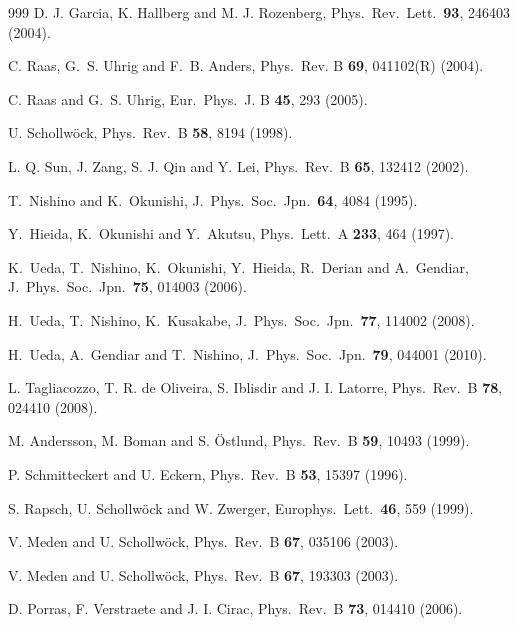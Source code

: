 \documentclass[a4paper,10pt,oneside,onecolumn,1p,times]{elsarticle}
\begin{document}
\begin{thebibliography}{999}
 D. J. Garcia, K. Hallberg and M. J. Rozenberg, Phys.\ Rev.\ Lett.\ {\bf 93}, 246403 (2004). 

C. Raas, G.~S. Uhrig and F.~B. Anders, Phys.\ Rev. B {\bf 69}, 041102(R) (2004).

C. Raas and G.~S. Uhrig, Eur.\ Phys.\ J. B {\bf 45}, 293 (2005).

U. Schollw\"{o}ck, Phys.\ Rev.\ B {\bf 58}, 8194 (1998).

L. Q. Sun, J. Zang, S. J. Qin and Y. Lei, Phys.\ Rev.\ B {\bf 65}, 132412 (2002).

 T.~Nishino and K.~Okunishi, J.\ Phys.\ Soc.\ Jpn.\ {\bf 64}, 4084 (1995).

 Y.~Hieida, K.~Okunishi and Y.~Akutsu, Phys.\ Lett.\ A {\bf 233}, 464 (1997).

 K.~Ueda, T.~Nishino, K.~Okunishi, Y.~Hieida, R.~Derian and A.~Gendiar, J.\ Phys.\ Soc.\ Jpn.\ {\bf 75}, 014003 (2006).

 H.~Ueda, T.~Nishino, K.~Kusakabe, J.\ Phys.\ Soc.\ Jpn.\ {\bf 77}, 114002 (2008).

 H.~Ueda, A.~Gendiar and T.~Nishino, J.\ Phys.\ Soc.\ Jpn.\ {\bf 79}, 044001 (2010).

 L. Tagliacozzo, T. R. de Oliveira, S. Iblisdir and J. I. Latorre, Phys.\ Rev.\ B {\bf 78}, 024410 (2008).

 M. Andersson, M. Boman and S. \"{O}stlund, Phys.\ Rev.\ B {\bf 59}, 10493 (1999).

 P. Schmitteckert and U. Eckern, Phys.\ Rev.\ B {\bf 53}, 15397 (1996).

 S. Rapsch, U. Schollw\"{o}ck and W. Zwerger, Europhys.\ Lett.\ {\bf 46}, 559 (1999).

 V. Meden and U. Schollw\"{o}ck, Phys.\ Rev.\ B {\bf 67}, 035106 (2003).

 V. Meden and U. Schollw\"{o}ck, Phys.\ Rev.\ B {\bf 67}, 193303 (2003).

 D. Porras, F. Verstraete and J. I. Cirac, Phys.\ Rev.\ B {\bf 73}, 014410 (2006).

\end{thebibliography}
\end{document}
